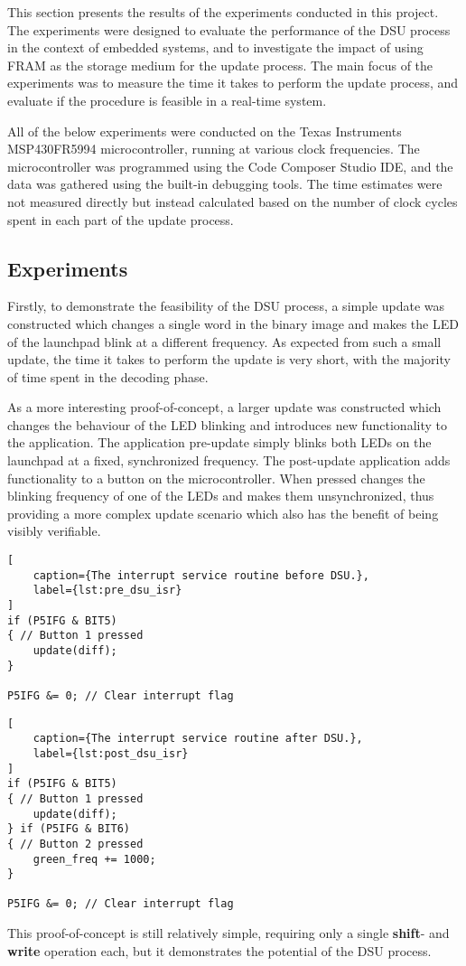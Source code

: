 This section presents the results of the experiments conducted in this project. The experiments were designed to evaluate the performance of the DSU process in the context of embedded systems, and to investigate the impact of using FRAM as the storage medium for the update process. The main focus of the experiments was to measure the time it takes to perform the update process, and evaluate if the procedure is feasible in a real-time system.

All of the below experiments were conducted on the Texas Instruments MSP430FR5994 microcontroller, running at various clock frequencies. The microcontroller was programmed using the Code Composer Studio IDE, and the data was gathered using the built-in debugging tools. The time estimates were not measured directly but instead calculated based on the number of clock cycles spent in each part of the update process. 

\subsection{Experiments}
Firstly, to demonstrate the feasibility of the DSU process, a simple update was constructed which changes a single word in the binary image and makes the LED of the launchpad blink at a different frequency. 
As expected from such a small update, the time it takes to perform the update is very short, with the majority of time spent in the decoding phase. 

As a more interesting proof-of-concept, a larger update was constructed which changes the behaviour of the LED blinking and introduces new functionality to the application. The application pre-update simply blinks both LEDs on the launchpad at a fixed, synchronized frequency. The post-update application adds functionality to a button on the microcontroller. When pressed changes the blinking frequency of one of the LEDs and makes them unsynchronized, thus providing a more complex update scenario which also has the benefit of being visibly verifiable. 

\noindent\begin{minipage}{.45\textwidth}
\begin{lstlisting}[
    caption={The interrupt service routine before DSU.},
    label={lst:pre_dsu_isr}
]
if (P5IFG & BIT5)
{ // Button 1 pressed
    update(diff);
}

P5IFG &= 0; // Clear interrupt flag
\end{lstlisting}
\end{minipage}\hfill
\noindent\begin{minipage}{.45\textwidth}
\begin{lstlisting}[
    caption={The interrupt service routine after DSU.},
    label={lst:post_dsu_isr}
]
if (P5IFG & BIT5)
{ // Button 1 pressed
    update(diff);
} if (P5IFG & BIT6)
{ // Button 2 pressed
    green_freq += 1000;
}

P5IFG &= 0; // Clear interrupt flag
\end{lstlisting}
\end{minipage}\hfill

This proof-of-concept is still relatively simple, requiring only a single \textbf{shift}- and \textbf{write} operation each, but it demonstrates the potential of the DSU process.
